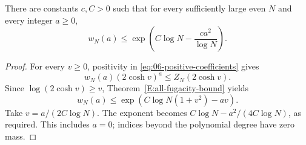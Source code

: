 \begin{corollary}\label{E:all-count-tail}
\label{lem:11-polygon-tail}
There are constants \(c,C>0\) such that for every sufficiently large
even \(N\) and every integer \(a\ge0\),
\begin{equation}
 w_N(a)\le
 \exp\!\left(C\log N-\frac{ca^2}{\log N}\right).
 \label{eq:L-40}
\end{equation}
\end{corollary}
\begin{proof}
For every \(v\ge0\), positivity in
\eqref{eq:06-positive-coefficients} gives
\[
 w_N(a)(2\cosh v)^a\le Z_N(2\cosh v).
\]
Since \(\log(2\cosh v)\ge v\),
Theorem~\ref{E:all-fugacity-bound} yields
\[
 w_N(a)\le\exp\!\left(C\log N(1+v^2)-av\right).
\]
Take \(v=a/(2C\log N)\). The exponent becomes
\(C\log N-a^2/(4C\log N)\), as required. This includes \(a=0\);
indices beyond the polynomial degree have zero mass.
\end{proof}
